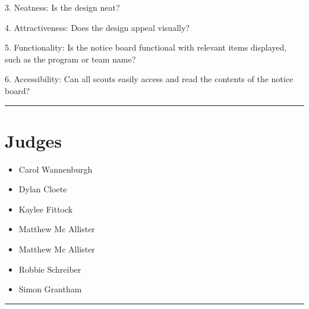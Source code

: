 \documentclass[10pt]{article}
\begin{document}
3. Neatness: Is the design neat?

4. Attractiveness: Does the design appeal visually?

5. Functionality: Is the notice board functional with relevant items displayed, such as the program or team name?

6. Accessibility: Can all scouts easily access and read the contents of the notice board?


\vspace{0.5cm}
	\hrule
	\vspace{0.5cm}
		\section*{\faUsers \: Judges}

		

	\begin{multicols}{2}

		\begin{itemize}
									\item Carol Wannenburgh
									\item Dylan Cloete
									\item Kaylee Fittock
									\item Matthew Mc Allister
						\end{itemize}

		\vfill\null
		\columnbreak

		\begin{itemize}
									\item Matthew Mc Allister
									\item Robbie Schreiber
									\item Simon Grantham
						\end{itemize}

		\vfill\null

		\end{multicols}



			\vspace{0.5cm}
	\hrule
	\vspace{0.5cm}
\end{document}
